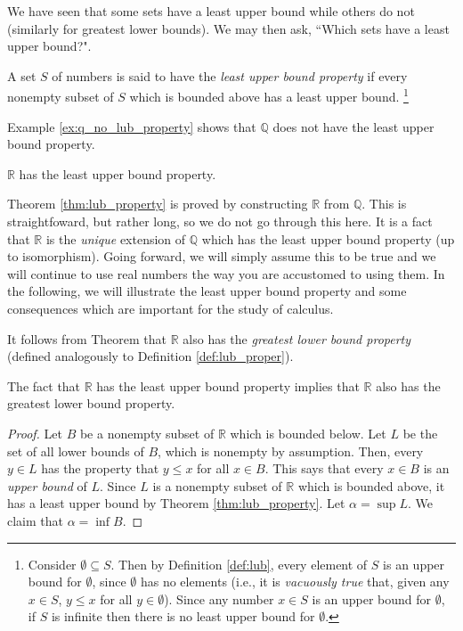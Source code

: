 \documentclass[12pt,letterpaper,reqno]{article}
\numberwithin{equation}{section}
\newcommand{\R}{\ensuremath{\mathbb R}}
\newcommand{\Q}{\ensuremath{\mathbb Q}}
\begin{document}
{We have seen that some sets have a least upper bound while others do not (similarly for greatest lower bounds). We may then ask, ``Which sets have a least upper bound?".

\begin{defn}\label{def:lub_proper}
	A set $S$ of numbers is said to have the \emph{least upper bound property} if every nonempty subset of $S$ which is bounded above has a least upper bound. \footnote{Consider $\emptyset \subseteq S$. Then by Definition \ref{def:lub},  every element of $S$ is an upper bound for $\emptyset$, since $\emptyset$ has no elements (i.e., it is \emph{vacuously true} that, given any $x \in S$, $y \leq x$ for all $y \in \emptyset$). Since any number $x \in S$ is an upper bound for $\emptyset$, if $S$ is infinite then there is no least upper bound for $\emptyset$.}
\end{defn}

Example \ref{ex:q_no_lub_property} shows that $\Q$ does not have the least upper bound property.

\begin{thm}[$\R$ has the least upper bound property.]\label{thm:lub_property}
	$\R$ has the least upper bound property.
\end{thm}

Theorem \ref{thm:lub_property} is proved by constructing $\R$ from $\Q$. This is straightfoward, but rather long, so we do not go through this here. It is a fact that $\R$ is the \emph{unique} extension of $\Q$ which has the least upper bound property (up to isomorphism). Going forward, we will simply assume this to be true and we will continue to use real numbers the way you are accustomed to using them. In the following, we will illustrate the least upper bound property and some consequences which are important for the study of calculus.

It follows from Theorem \label{thm:lub_property} that $\R$ also has the \emph{greatest lower bound property} (defined analogously to Definition \ref{def:lub_proper}).

\begin{thm}
The fact that $\R$ has the least upper bound property implies that $\R$ also has the greatest lower bound property.
\end{thm}

\begin{proof}
	Let $B$ be a nonempty subset of $\R$ which is bounded below. Let $L$ be the set of all lower bounds of $B$, which is nonempty by assumption. Then, every $y \in L$ has the property that $y \leq x$ for all $x \in B$. This says that every $x \in B$ is an \emph{upper bound} of $L$. Since $L$ is a nonempty subset of $\R$ which is bounded above, it has a least upper bound by Theorem \ref{thm:lub_property}. Let $\alpha=\sup L$. We claim that $\alpha=\inf B$. 
	

\end{proof}}
\end{document}
